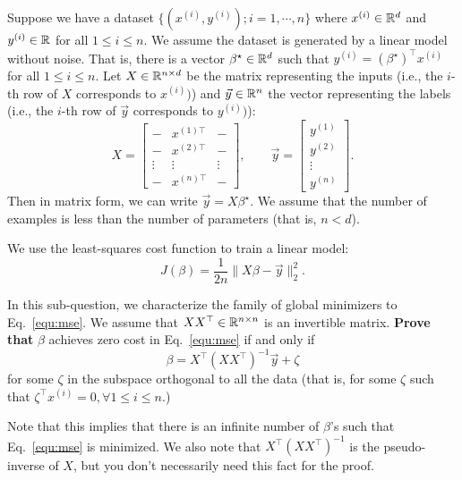 \item{} Suppose we have a dataset $\{(x^{(i)}, y^{(i)});i=1,\cdots,n\}$ where $x^{(i)}\in \mathbb{R}^{d}$ and $y^{(i)}\in \mathbb{R}$ for all $1\le i\le n.$ We assume the dataset is generated by a linear model without noise. That is, there is a vector $\beta^\star\in\mathbb{R}^{d}$ such that $y^{(i)}=(\beta^\star)^\top x^{(i)}$ for all $1\le i\le n$. Let $X\in \mathbb{R}^{n\times d}$ be the matrix representing the inputs (i.e., the $i$-th row of $X$ corresponds to $x^{(i)})$) and $\vec{y}\in\mathbb{R}^{n}$ the vector representing the labels (i.e., the $i$-th row of $\vec{y}$ corresponds to $y^{(i)})$):
$$
	X=
\begin{bmatrix}
	- & x^{(1)\top} & - \\
	- & x^{(2)\top} & - \\
	\vdots & \vdots & \vdots\\
	- & x^{(n)\top} & - 
\end{bmatrix},\qquad
\vec{y}=
\begin{bmatrix}
y^{(1)} \\
y^{(2)}\\
\vdots\\
y^{(n)}
\end{bmatrix}.
$$
Then in matrix form, we can write $\vec{y}=X\beta^\star.$
We assume that the number of examples is less than the number of parameters (that is, $n<d$).

We use the least-squares cost function to train a linear model:
\begin{equation}\label{equ:mse}
	J(\beta)=\frac{1}{2n}\|X\beta-\vec{y}\|_2^2.
\end{equation}

In this sub-question, we characterize the family of global minimizers to Eq.~\eqref{equ:mse}. We assume that $X X^\top\in \mathbb{R}^{n\times n}$ is an invertible matrix. \textbf{Prove that} $\beta$ achieves zero cost in Eq.~\eqref{equ:mse} if and only if 
\begin{equation}\label{equ:ir2}
	\beta=X^\top (XX^\top)^{-1}\vec{y}+\zeta
\end{equation} for some $\zeta$ in the subspace orthogonal to all the data (that is, for some $\zeta$ such that $\zeta^\top x^{(i)}=0,\forall 1\le i\le n.$) 

Note that this implies that there is an infinite number of $\beta$'s such that Eq.~\eqref{equ:mse} is minimized. We also note that $X^\top (XX^\top)^{-1}$ is the pseudo-inverse of $X$, but you don't necessarily need this fact for the proof.

